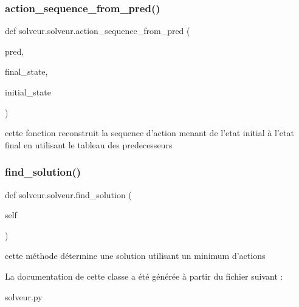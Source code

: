 \subsubsection{\texorpdfstring{action\+\_\+sequence\+\_\+from\+\_\+pred()}{action\_sequence\_from\_pred()}}
{\footnotesize\ttfamily def solveur.\+solveur.\+action\+\_\+sequence\+\_\+from\+\_\+pred (\begin{DoxyParamCaption}\item[{}]{pred,  }\item[{}]{final\+\_\+state,  }\item[{}]{initial\+\_\+state }\end{DoxyParamCaption})\hspace{0.3cm}{\ttfamily [static]}}

\begin{DoxyVerb}cette fonction reconstruit la sequence d'action menant de l'etat initial à l'etat final
en utilisant le tableau des predecesseurs
\end{DoxyVerb}
 \mbox{\label{classsolveur_1_1solveur_aae96bc7e6e7b11a51d4a55564414ba92}} 
\subsubsection{\texorpdfstring{find\+\_\+solution()}{find\_solution()}}
{\footnotesize\ttfamily def solveur.\+solveur.\+find\+\_\+solution (\begin{DoxyParamCaption}\item[{}]{self }\end{DoxyParamCaption})}

\begin{DoxyVerb}cette méthode détermine une solution utilisant un minimum d'actions
\end{DoxyVerb}
 

La documentation de cette classe a été générée à partir du fichier suivant \+:\begin{DoxyCompactItemize}
\item 
solveur.\+py\end{DoxyCompactItemize}
